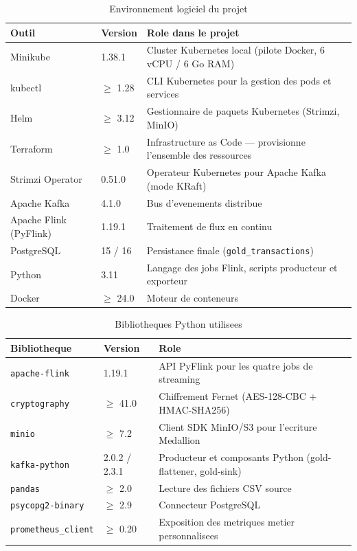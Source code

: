 \begin{table}[H]
\centering
\renewcommand{\arraystretch}{1.5}
\begin{tabular}{|l|l|p{7.3cm}|}
\hline
\textbf{Outil} & \textbf{Version} & \textbf{Role dans le projet} \\
\hline
Minikube & 1.38.1 & Cluster Kubernetes local (pilote Docker, 6 vCPU / 6 Go RAM) \\
kubectl & $\geq$ 1.28 & CLI Kubernetes pour la gestion des pods et services \\
Helm & $\geq$ 3.12 & Gestionnaire de paquets Kubernetes (Strimzi, MinIO) \\
Terraform & $\geq$ 1.0 & Infrastructure as Code --- provisionne l'ensemble des ressources \\
Strimzi Operator & 0.51.0 & Operateur Kubernetes pour Apache Kafka (mode KRaft) \\
Apache Kafka & 4.1.0 & Bus d'evenements distribue \\
Apache Flink (PyFlink) & 1.19.1 & Traitement de flux en continu \\
PostgreSQL & 15 / 16 & Persistance finale (\texttt{gold\_transactions}) \\
Python & 3.11 & Langage des jobs Flink, scripts producteur et exporteur \\
Docker & $\geq$ 24.0 & Moteur de conteneurs \\
\hline
\end{tabular}
\caption{Environnement logiciel du projet}
\label{tab:outils}
\end{table}

\begin{table}[H]
\centering
\renewcommand{\arraystretch}{1.5}
\begin{tabular}{|l|l|p{7.6cm}|}
\hline
\textbf{Bibliotheque} & \textbf{Version} & \textbf{Role} \\
\hline
\texttt{apache-flink} & 1.19.1 & API PyFlink pour les quatre jobs de streaming \\
\texttt{cryptography} & $\geq$ 41.0 & Chiffrement Fernet (AES-128-CBC + HMAC-SHA256) \\
\texttt{minio} & $\geq$ 7.2 & Client SDK MinIO/S3 pour l'ecriture Medallion \\
\texttt{kafka-python} & 2.0.2 / 2.3.1 & Producteur et composants Python (gold-flattener, gold-sink) \\
\texttt{pandas} & $\geq$ 2.0 & Lecture des fichiers CSV source \\
\texttt{psycopg2-binary} & $\geq$ 2.9 & Connecteur PostgreSQL \\
\texttt{prometheus\_client} & $\geq$ 0.20 & Exposition des metriques metier personnalisees \\
\hline
\end{tabular}
\caption{Bibliotheques Python utilisees}
\label{tab:libs}
\end{table}

